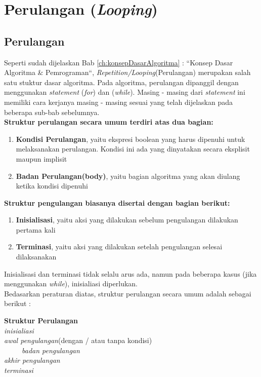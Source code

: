 \chapter{Perulangan (\textit{Looping})}

\section{Perulangan}
Seperti sudah dijelaskan Bab \ref{ch:konsepDasarAlgoritma} : ``Konsep Dasar Algoritma \& Pemrograman``, \textit{Repetition/Looping}(Perulangan) merupakan salah satu stuktur dasar algoritma. Pada algoritma, perulangan dipanggil dengan menggunakan \textit{statement} (\textit{for}) dan (\textit{while}). Masing - masing dari \textit{statement} ini memiliki cara kerjanya masing - masing sesuai yang telah dijelaskan pada beberapa sub-bab sebelumnya.   \\
\hfill \break
\textbf{Struktur perulangan secara umum terdiri atas dua bagian:}
\begin{enumerate}
	\item \textbf{Kondisi Perulangan}, yaitu ekspresi boolean yang harus dipenuhi untuk melaksanakan perulangan. Kondisi ini ada yang dinyatakan secara eksplisit maupun implisit
		\item \textbf{Badan Perulangan(body)}, yaitu bagian algoritma yang akan diulang ketika kondisi dipenuhi \\
\end{enumerate}
\hfill \break
\textbf{Struktur pengulangan biasanya disertai dengan bagian berikut:} 
\begin{enumerate}
	\item \textbf{Inisialisasi}, yaitu aksi yang dilakukan sebelum pengulangan dilakukan pertama kali 
	\item \textbf{Terminasi}, yaitu aksi yang dilakukan setelah pengulangan selesai dilaksanakan
\end{enumerate}
Inisialisasi dan terminasi tidak selalu arus ada, namun pada beberapa kasus (jika menggunakan \textit{while}), inisialiasi diperlukan. \\
\hfill \break
Bedasarkan peraturan diatas, struktur perulangan secara umum adalah sebagai berikut : 
\newpage
\begin{Petunjuk}
\label{Ptk:Struktur Perulangan}
	\textbf{Struktur Perulangan}\\
		\textit{inisialiasi}\\
		\textit{awal pengulangan}(dengan / atau tanpa kondisi)\\
		~~~~~\textit{badan pengulangan}\\
		\textit{akhir pengulangan}\\
		\textit{terminasi}\\
\end{Petunjuk}

